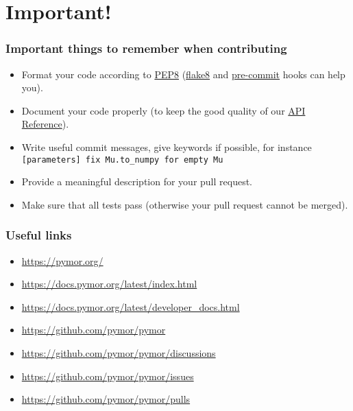 \documentclass[%
]{beamer}
\begin{document}
\section{Important!}
\begin{frame}[fragile]
	\frametitle{Important things to remember when contributing}

	\begin{itemize}
		\item Format your code according to \href{https://www.python.org/dev/peps/pep-0008/}{PEP8} (\href{https://flake8.pycqa.org/en/latest/}{flake8} and \href{https://pre-commit.com/}{pre-commit} hooks can help you).
		\item Document your code properly (to keep the good quality of our \href{https://docs.pymor.org/latest/autoapi/index.html}{API Reference}).
		\item Write useful commit messages, give keywords if possible, for instance \texttt{[parameters] fix Mu.to_numpy for empty Mu}
		\item Provide a meaningful description for your pull request.
		\item Make sure that all tests pass (otherwise your pull request cannot be merged).
	\end{itemize}
\end{frame}
\begin{frame}[fragile]
	\frametitle{Useful links}
	
	\begin{itemize}
		\item {} \href{https://pymor.org/}{https://pymor.org/}
		\item {} \href{https://docs.pymor.org/latest/index.html}{https://docs.pymor.org/latest/index.html}
		\item {} \href{https://docs.pymor.org/latest/developer_docs.html}{https://docs.pymor.org/latest/developer\_docs.html}
		\item {} \href{https://github.com/pymor/pymor}{https://github.com/pymor/pymor}
		\item {} \href{https://github.com/pymor/pymor/discussions}{https://github.com/pymor/pymor/discussions}
		\item {} \href{https://github.com/pymor/pymor/issues}{https://github.com/pymor/pymor/issues}
		\item {} \href{https://github.com/pymor/pymor/pulls}{https://github.com/pymor/pymor/pulls}
	\end{itemize}
\end{frame}
\end{document}
